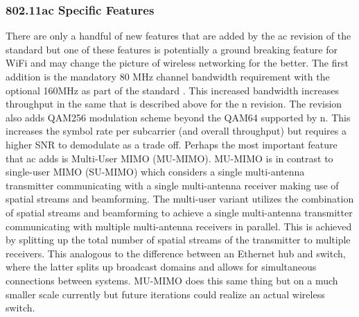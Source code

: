 \subsubsection{802.11ac Specific Features}

There are only a handful of new features that are added by the ac revision of the standard but one of these features is potentially a ground breaking feature for WiFi and may change the picture of wireless networking for the better. The first addition is the mandatory 80 MHz channel bandwidth requirement with the optional 160MHz as part of the standard \cite{ieee802ac}. This increased bandwidth increases throughput in the same that is described above for the n revision. The revision also adds QAM256 modulation scheme beyond the QAM64 supported by n. This increases the symbol rate per subcarrier (and overall throughput) but requires a higher SNR to demodulate as a trade off. Perhaps the most important feature that ac adds is Multi-User MIMO (MU-MIMO). MU-MIMO is in contrast to single-user MIMO (SU-MIMO) which considers a single multi-antenna transmitter communicating with a single multi-antenna receiver making use of spatial streams and beamforming. The multi-user variant utilizes the combination of spatial streams and beamforming to achieve a single multi-antenna transmitter communicating with multiple multi-antenna receivers in parallel. This is achieved by splitting up the total number of spatial streams of the transmitter to multiple receivers. This analogous to the difference between an Ethernet hub and switch, where the latter splits up broadcast domains and allows for simultaneous connections between systems. MU-MIMO does this same thing but on a much smaller scale currently but future iterations could realize an actual wireless switch.

